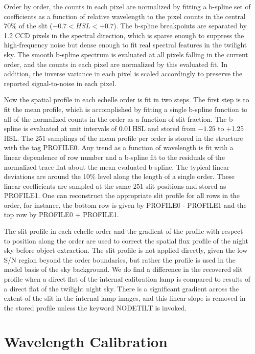 \documentclass[12pt,preprint]{aastex}
\begin{document}
Order by order, the counts in each pixel are normalized by 
fitting a b-spline set of 
coefficients as a function of relative wavelength to the pixel counts
in the central 70\% of the slit ($-0.7 < HSL < +0.7$).
The b-spline breakpoints are 
separated by 1.2 CCD pixels in the spectral direction, which is sparse enough
to suppress the high-frequency noise but dense enough to fit real 
spectral features in the twilight sky.
The smooth b-spline spectrum is evaluated at all pixels falling in the current
order, and the counts in each pixel are normalized by this evaluated fit.
In addition, the inverse variance in each pixel is scaled accordingly to 
preserve the reported signal-to-noise in each pixel.

Now the spatial profile in each echelle order is fit in two steps.  The first
step is to fit the mean profile, which is accomplished by fitting a single
b-spline function to all of the normalized counts in the order as a function of 
slit fraction.  The b-spline is evaluated at unit intervals of 0.01\,HSL and stored
from $-1.25$ to +1.25\,HSL.  The 251 samplings of the mean profile per order
is stored in the structure with the tag PROFILE0.
Any trend as a function of wavelength is fit with a linear dependence of
row number and a b-spline fit to the residuals of the normalized trace flat
about the mean evaluated b-spline.  The typical linear deviations are 
around the 10\% level along the length of a single order.
These linear coefficients are sampled at the same 251 slit positions and
stored as PROFILE1.  One can reconstruct the appropriate slit profile
for all rows in the order, for instance, the bottom row is given by 
PROFILE0 - PROFILE1 and the top row by PROFILE0 + PROFILE1.

The slit profile in each echelle order 
and the gradient of the profile with respect to position along the order
are used to correct the spatial flux profile of the night sky before 
object extraction.
The slit profile is not applied directly, given the low S/N region beyond 
the order boundaries, but rather the profile is used in the model basis 
of the sky background.  We do find a difference in the recovered slit profile
when a direct flat of the internal calibration lamp is compared
to results of a direct flat of the twilight night sky.  There is a significant
gradient across the extent of the slit in the internal lamp images, and
this linear slope is removed in the stored profile unless the keyword 
NODETILT is invoked.


\section{Wavelength Calibration}
\label{sec:wave}
\end{document}
